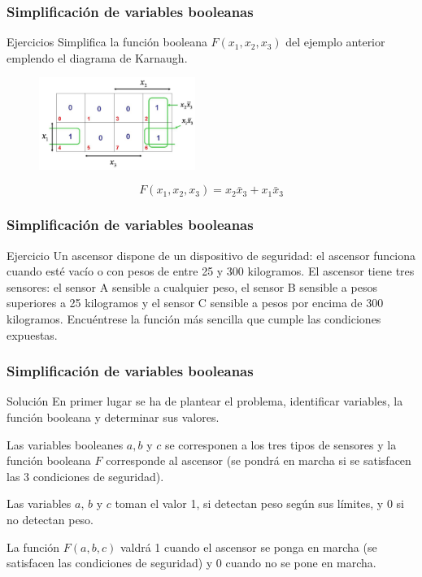 \documentclass{beamer}
\begin{document}
\begin{frame}
\frametitle{Simplificaci\'on de variables booleanas}
\begin{block}{Ejercicios}
Simplifica la funci\'on booleana $F(x_1,x_2,x_3)$ del ejemplo anterior emplendo el diagrama de Karnaugh.
\end{block}
 \begin{figure}[h]
  \label{fig:volumen}
\centering
\includegraphics[height=3cm]{k8}
\end{figure}
\[F(x_1,x_2,x_3) = x_2\bar x_3 + x_1\bar x_3\]
\end{frame}



\begin{frame}
\frametitle{Simplificaci\'on de variables booleanas}
\begin{block}{Ejercicio}
Un ascensor dispone de un dispositivo de seguridad: el ascensor funciona cuando est\'e vac\'io o con pesos de entre 25 y 300 kilogramos. El ascensor tiene tres sensores: el sensor A sensible a cualquier peso, el sensor B sensible a pesos superiores a 25 kilogramos y el sensor C sensible a pesos por encima de 300 kilogramos. Encu\'entrese la funci\'on m\'as sencilla que cumple las condiciones expuestas.
\end{block}

\end{frame}






\begin{frame}
\frametitle{Simplificaci\'on de variables booleanas}
\begin{block}{Soluci\'on}
En primer lugar se ha de plantear el problema, identificar variables, la funci\'on booleana y determinar sus valores.

Las variables booleanes $a,b$ y $c$ se corresponen a los tres tipos de sensores y la funci\'on booleana $F$ corresponde al ascensor (se pondr\'a en marcha si se satisfacen las 3 condiciones de seguridad). 

Las variables $a$, $b$ y $c$ toman el valor 1, si detectan peso seg\'un sus l\'imites, y 0 si no detectan peso. 

La funci\'on $F(a,b,c)$ valdr\'a 1 cuando el ascensor se ponga en marcha (se satisfacen las condiciones de seguridad) y 0 cuando no se pone en marcha. 
\end{block}

\end{frame}
\end{document}
